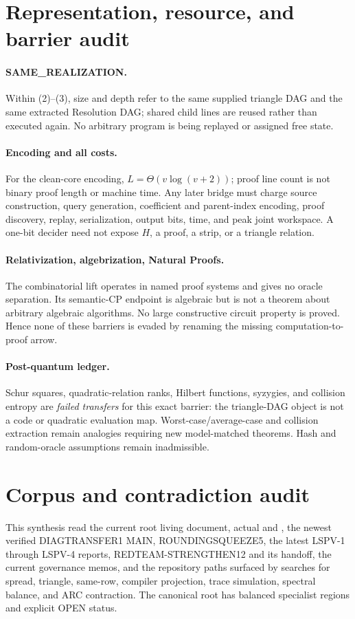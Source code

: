\documentclass[11pt]{article}
\begin{document}
\section{Representation, resource, and barrier audit}
\paragraph{SAME\_REALIZATION.}
Within (2)--(3), size and depth refer to the same supplied triangle DAG and the same
extracted Resolution DAG; shared child lines are reused rather than executed again.
No arbitrary program is being replayed or assigned free state.

\paragraph{Encoding and all costs.}
For the clean-core encoding, $L=\Theta(v\log(v+2))$; proof line count is not binary
proof length or machine time.  Any later bridge must charge source construction,
query generation, coefficient and parent-index encoding, proof discovery, replay,
serialization, output bits, time, and peak joint workspace.  A one-bit decider need
not expose $H$, a proof, a strip, or a triangle relation.

\paragraph{Relativization, algebrization, Natural Proofs.}
The combinatorial lift operates in named proof systems and gives no oracle separation.
Its semantic-CP endpoint is algebraic but is not a theorem about arbitrary algebraic
algorithms.  No large constructive circuit property is proved.  Hence none of these
barriers is evaded by renaming the missing computation-to-proof arrow.

\paragraph{Post-quantum ledger.}
Schur squares, quadratic-relation ranks, Hilbert functions, syzygies, and collision
entropy are \emph{failed transfers} for this exact barrier: the triangle-DAG object is
not a code or quadratic evaluation map.  Worst-case/average-case and collision
extraction remain analogies requiring new model-matched theorems.  Hash and
random-oracle assumptions remain inadmissible.

\section{Corpus and contradiction audit}
This synthesis read the current root living document, actual  and
, the newest verified DIAGTRANSFER1 MAIN, ROUNDINGSQUEEZE5, the latest
LSPV-1 through LSPV-4 reports, REDTEAM-STRENGTHEN12 and its handoff, the current
governance memos, and the repository paths surfaced by searches for spread, triangle,
same-row, compiler projection, trace simulation, spectral balance, and ARC contraction.
The canonical root has balanced specialist regions and explicit OPEN status.
\end{document}
